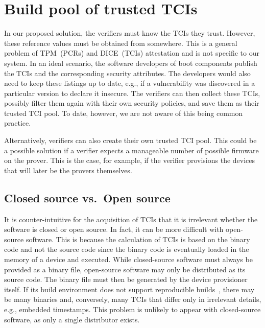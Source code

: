 \section{Build pool of trusted TCIs}

In our proposed solution, the verifiers must know the TCIs they trust.
However, these reference values must be obtained from somewhere.
This is a general problem of TPM~(PCRs) and DICE~(TCIs) attestation and is not specific to our system.
In an ideal scenario, the software developers of boot components publish the TCIs and the corresponding security attributes.
The developers would also need to keep these listings up to date, e.g., if a vulnerability was discovered in a particular version to declare it insecure.
The verifiers can then collect these TCIs, possibly filter them again with their own security policies, and save them as their trusted TCI pool.
To date, however, we are not aware of this being common practice.

Alternatively, verifiers can also create their own trusted TCI pool.
This could be a possible solution if a verifier expects a manageable number of possible firmware on the prover.
This is the case, for example, if the verifier provisions the devices that will later be the provers themselves.

\subsection{Closed source vs.\ Open source}

It is counter-intuitive for the acquisition of TCIs that it is irrelevant whether the software is closed or open source.
In fact, it can be more difficult with open-source software.
This is because the calculation of TCIs is based on the binary code and not the source code since the binary code is eventually loaded in the memory of a device and executed.
While closed-source software must always be provided as a binary file, open-source software may only be distributed as its source code.
The binary file must then be generated by the device provisioner itself.
If its build environment does not support reproducible builds~\cite{Lamb2022}, there may be many binaries and, conversely, many TCIs that differ only in irrelevant details, e.g., embedded timestamps.
This problem is unlikely to appear with closed-source software, as only a single distributor exists.

